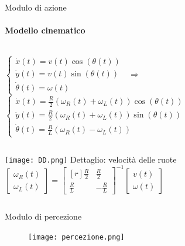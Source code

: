 \documentclass[handout]{beamer}
\begin{document}
\renewcommand{\arraystretch}{1.5}
\begin{frame}{Modulo di azione}
\framesubtitle{Modello cinematico}
\begin{columns}
\centering
${
\begin{cases}
\dot{x}(t) = v(t)\cos(\theta(t)) \\
\dot{y}(t) = v(t)\sin(\theta(t)) \\
\dot{\theta}(t) = \omega(t)
\end{cases}
}$
\centering
$ \ \Rightarrow $
\centering
${
\begin{cases}
\dot{x}(t) = \frac{R}{2} \left( \omega_R(t)+\omega_L(t) \right) \cos(\theta(t)) \\
\dot{y}(t) = \frac{R}{2} \left( \omega_R(t)+\omega_L(t) \right)\sin(\theta(t)) \\
\dot{\theta}(t) = \frac{R}{L} \left( \omega_R(t)-\omega_L(t) \right)
\end{cases}
}$
\end{columns}
\vspace{5mm}
\begin{columns}
\texttt{[image: DD.png]}
\centering
Dettaglio: velocità delle ruote \\
\vspace*{1mm}
\(
{\begin{bmatrix}
\omega_R(t) \\
\omega_L(t)
\end{bmatrix} =
\begin{bmatrix*}[r]
\frac{R}{2} & \frac{R}{2} \\
\frac{R}{L} & -\frac{R}{L}
\end{bmatrix*}^{-1}
\begin{bmatrix}
v(t) \\
\omega(t)
\end{bmatrix}}
\)
\end{columns}
\end{frame}

\begin{frame}{Modulo di percezione}
\centering
\begin{figure}
\texttt{[image: percezione.png]}
\end{figure}
\end{frame}
\end{document}
